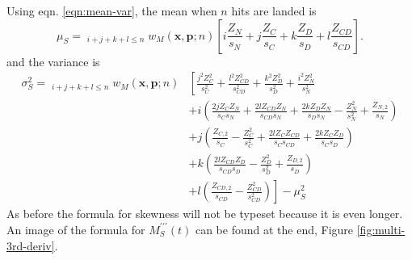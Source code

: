\documentclass{article}
\newcommand{\multisum}{\ensuremath{\mathop{\sum_{i=0}^n \sum_{i=j}^n \sum_{k=0}^{n} \sum_{l=0}^n}_{i+j+k+l \le n} }}
\begin{document}
        Using eqn. \ref{eqn:mean-var}, the mean when $n$ hits are landed is
        \begin{equation}
            \mu_S = \multisum w_M(\textbf{x}, \textbf{p};n)\left[i \frac{Z_N}{s_N} + j\frac{Z_C}{s_C} + k \frac{Z_D}{s_D} + l \frac{Z_{CD}}{s_{CD}}\right].
        \end{equation}
        and the variance is
        \begin{equation}
            \begin{split}
                \sigma_S^2 = \multisum w_M(\textbf{x}, \textbf{p};n) & \left[ \frac{j^2 Z_C^2}{s_C^2} + \frac{l^2 Z_{CD}^2}{s_{CD}^2} + \frac{k^2 Z_D^2}{s_D^2} + \frac{i^2 Z_N^2}{s_N^2} \right. \\
                &+ i \left(\frac{2 j Z_C Z_N}{s_C s_N} + \frac{2 l Z_{CD} Z_N}{s_{CD} s_N} + \frac{2 k Z_D Z_N}{s_D s_N} - \frac{Z_N^2}{s_N^2} + \frac{Z_{N,2}}{s_N}\right) \\
                & +j \left(\frac{Z_{C,2}}{s_C} - \frac{Z_C^2}{s_C^2}  + \frac{2 l Z_C Z_{CD}}{s_C s_{CD}} + \frac{2 k Z_C Z_D}{s_C s_D}\right) \\
                & + k \left(\frac{2 l Z_{CD} Z_D}{s_{CD} s_D} - \frac{Z_D^2}{s_D^2} + \frac{Z_{D,2}}{s_D}\right)  \\ 
                & \left. + l \left(\frac{Z_{CD,2}}{s_{CD}} - \frac{Z_{CD}^2}{s_{CD}^2}\right)\right] - \mu_{S}^2
            \end{split}
        \end{equation}
        As before the formula for skewness will not be typeset because it is even longer. An image of the formula for $M^{\prime\prime\prime}_S(t)$ can be found at the end, Figure \ref{fig:multi-3rd-deriv}.
\end{document}
